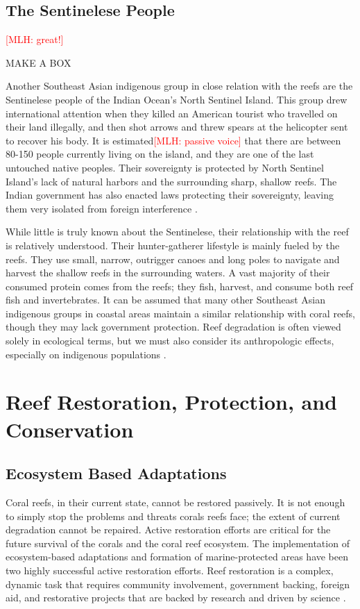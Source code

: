 \documentclass{book}\usepackage{knitr}
\newcommand{\red}[1]{\textcolor{red}{[MLH: #1]}}
\begin{document}
\begin{knitrout}
\begin{kframe}
{\subsection{The Sentinelese People}\red{great!}

MAKE A BOX

Another Southeast Asian indigenous group in close relation with the reefs are the Sentinelese people of the Indian Ocean’s North Sentinel Island. This group drew international attention when they killed an American tourist who travelled on their land illegally, and then shot arrows and threw spears at the helicopter sent to recover his body. It is estimated\red{passive voice} that there are between 80-150 people currently living on the island, and they are one of the last untouched native peoples. Their sovereignty is protected by North Sentinel Island’s lack of natural harbors and the surrounding sharp, shallow reefs. The Indian government has also enacted laws protecting their sovereignty, leaving them very isolated from foreign interference \citep{Smith}.

While little is truly known about the Sentinelese, their relationship with the reef is relatively understood. Their hunter-gatherer lifestyle is mainly fueled by the reefs. They use small, narrow, outrigger canoes and long poles to navigate and harvest the shallow reefs in the surrounding waters. A vast majority of their consumed protein comes from the reefs; they fish, harvest, and consume both reef fish and invertebrates. It can be assumed that many other Southeast Asian indigenous groups in coastal areas maintain a similar relationship with coral reefs, though they may lack government protection. Reef degradation is often viewed solely in ecological terms, but we must also consider its anthropologic effects, especially on indigenous populations \citep{Smith}.

\section{Reef Restoration, Protection, and Conservation}

\subsection{Ecosystem Based Adaptations}

Coral reefs, in their current state, cannot be restored passively. It is not enough to simply stop the problems and threats corals reefs face; the extent of current degradation cannot be repaired. Active restoration efforts are critical for the future survival of the corals and the coral reef ecosystem. The implementation of ecosystem-based adaptations and formation of marine-protected areas have been two highly successful active restoration efforts. Reef restoration is a complex, dynamic task that requires community involvement, government backing, foreign aid, and restorative projects that are backed by research and driven by science \citep{14551496520201201}. 

}
\end{kframe}
\end{knitrout}
\end{document}
